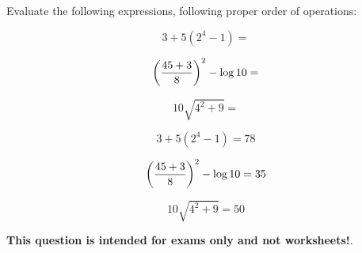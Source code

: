 

Evaluate the following expressions, following proper order of operations:

$$3 + 5(2^4 - 1) = $$

$$\left({{45 + 3} \over 8}\right)^2 - \log 10 = $$

$$10 \sqrt{4^2 + 9} = $$







$$3 + 5(2^4 - 1) = 78$$

$$\left({{45 + 3} \over 8}\right)^2 - \log 10 = 35$$

$$10 \sqrt{4^2 + 9} = 50$$







{\bf This question is intended for exams only and not worksheets!}.




